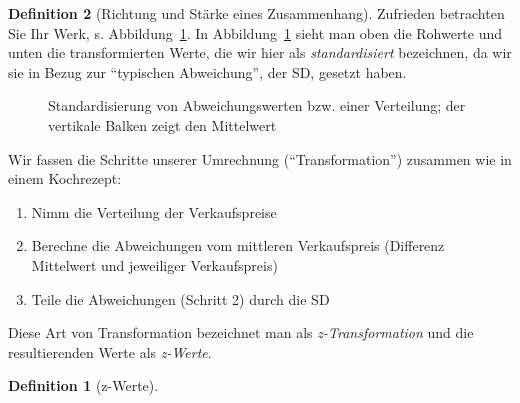 \documentclass[
  a4paper,
  DIV=11]{scrreprt}
\providecommand{\tightlist}{%
  \setlength{\itemsep}{0pt}\setlength{\parskip}{0pt}}\usepackage{longtable,booktabs,array}
\theoremstyle{definition}
\theoremstyle{definition}
\theoremstyle{definition}
\newtheorem{definition}{Definition}[chapter]
\theoremstyle{remark}
\begin{document}
\begin{definition}[Richtung und Stärke eines
Zusammenhang]
Zufrieden betrachten Sie Ihr Werk, s. Abbildung~\ref{fig-z-transf}. In
Abbildung~\ref{fig-z-transf} sieht man oben die Rohwerte und unten die
transformierten Werte, die wir hier als \emph{standardisiert}
bezeichnen, da wir sie in Bezug zur ``typischen Abweichung'', der SD,
gesetzt haben.

\begin{figure}


\caption{\label{fig-z-transf}Standardisierung von Abweichungswerten bzw.
einer Verteilung; der vertikale Balken zeigt den Mittelwert}

\end{figure}%

Wir fassen die Schritte unserer Umrechnung (``Transformation'') zusammen
wie in einem Kochrezept:

\begin{enumerate}
\def\labelenumi{\arabic{enumi}.}
\tightlist
\item
  Nimm die Verteilung der Verkaufspreise
\item
  Berechne die Abweichungen vom mittleren Verkaufspreis (Differenz
  Mittelwert und jeweiliger Verkaufspreis)
\item
  Teile die Abweichungen (Schritt 2) durch die SD
\end{enumerate}

Diese Art von Transformation bezeichnet man als \emph{z-Transformation}
und die resultierenden Werte als \emph{z-Werte}.

\begin{definition}[z-Werte]\protect\hypertarget{def-z-werte}{}\label{def-z-werte}


\end{definition}
\end{definition}
\end{document}
